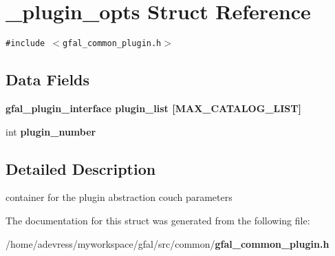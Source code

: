 \section{\_\-plugin\_\-opts Struct Reference}
\label{struct__plugin__opts}
{\tt \#include $<$gfal\_\-common\_\-plugin.h$>$}

\subsection*{Data Fields}
\begin{CompactItemize}
\item 
\bf{gfal\_\-plugin\_\-interface} \textbf{plugin\_\-list} [MAX\_\-CATALOG\_\-LIST]\label{struct__plugin__opts_1334caca0656940dd18ff607767e62e3}

\item 
int \textbf{plugin\_\-number}\label{struct__plugin__opts_cd39252f5f48e6ba19ca2d2a3be04985}

\end{CompactItemize}


\subsection{Detailed Description}
container for the plugin abstraction couch parameters 



The documentation for this struct was generated from the following file:\begin{CompactItemize}
\item 
/home/adevress/myworkspace/gfal/src/common/\bf{gfal\_\-common\_\-plugin.h}\end{CompactItemize}
